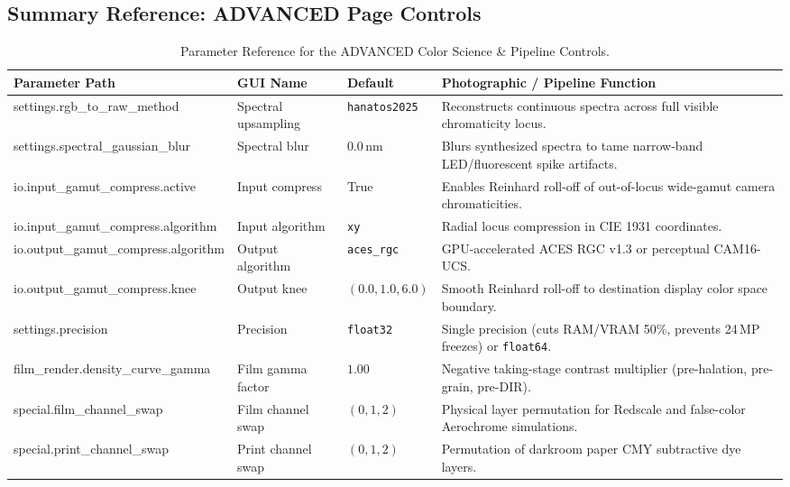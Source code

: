 \documentclass[11pt,a4paper]{article}
\begin{document}
\subsection{Summary Reference: ADVANCED Page Controls}

\begin{table}[h]
\centering
\small
\begin{tabularx}{\textwidth}{>{\raggedright\arraybackslash\ttfamily\footnotesize}p{4.2cm} >{\raggedright\arraybackslash\footnotesize}p{2.8cm} >{\raggedright\arraybackslash\footnotesize}p{2.2cm} >{\raggedright\arraybackslash\footnotesize}X}
\toprule
\textbf{\rmfamily Parameter Path} & \textbf{\rmfamily GUI Name} & \textbf{\rmfamily Default} & \textbf{\rmfamily Photographic / Pipeline Function} \\
\midrule
settings.rgb\_to\_raw\_method & Spectral upsampling & \texttt{hanatos2025} & Reconstructs continuous spectra across full visible chromaticity locus. \\
settings.spectral\_gaussian\_blur & Spectral blur & $0.0\,\text{nm}$ & Blurs synthesized spectra to tame narrow-band LED/fluorescent spike artifacts. \\
io.input\_gamut\_compress.active & Input compress & True & Enables Reinhard roll-off of out-of-locus wide-gamut camera chromaticities. \\
io.input\_gamut\_compress.algorithm & Input algorithm & \texttt{xy} & Radial locus compression in CIE 1931 coordinates. \\
io.output\_gamut\_compress.algorithm & Output algorithm & \texttt{aces\_rgc} & GPU-accelerated ACES RGC v1.3 or perceptual CAM16-UCS. \\
io.output\_gamut\_compress.knee & Output knee & $(0.0, 1.0, 6.0)$ & Smooth Reinhard roll-off to destination display color space boundary. \\
settings.precision & Precision & \texttt{float32} & Single precision (cuts RAM/VRAM 50\%, prevents 24\,MP freezes) or \texttt{float64}. \\
film\_render.density\_curve\_gamma & Film gamma factor & $1.00$ & Negative taking-stage contrast multiplier (pre-halation, pre-grain, pre-DIR). \\
special.film\_channel\_swap & Film channel swap & $(0, 1, 2)$ & Physical layer permutation for Redscale and false-color Aerochrome simulations. \\
special.print\_channel\_swap & Print channel swap & $(0, 1, 2)$ & Permutation of darkroom paper CMY subtractive dye layers. \\
\bottomrule
\end{tabularx}
\caption{Parameter Reference for the ADVANCED Color Science \& Pipeline Controls.}
\end{table}
\end{document}
